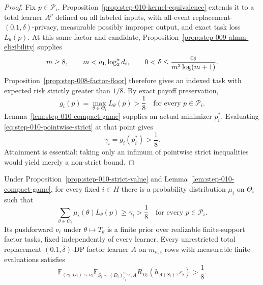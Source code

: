 \begin{proof}
Fix \(p\in\mathcal P_i\).  Proposition~\ref{prop:step-010-kernel-equivalence}
extends it to a total learner \(A^p\) defined on all labeled inputs, with
all-event replacement-\((0.1,\delta)\)-privacy, measurable possibly
improper output, and exact task loss \(L_\theta(p)\).  At this same factor
and candidate, Proposition~\ref{prop:step-009-almm-eligibility} supplies
\begin{equation}\label{eq:step-010-floor-eligibility}
m\ge8,
\qquad m<a_{\rm L}\log_2^*d_i,
\qquad
0<\delta\le\frac{c_\delta}{m^2\log(m+1)}.
\end{equation}
Proposition~\ref{prop:step-008-factor-floor} therefore gives an indexed
task with expected risk strictly greater than \(1/8\).  By exact payoff
preservation,
\begin{equation}\label{eq:step-010-pointwise-strict}
g_i(p)=\max_{\theta\in\Theta_i}L_\theta(p)>\frac18
\quad\text{for every }p\in\mathcal P_i.
\end{equation}
Lemma~\ref{lem:step-010-compact-game} supplies an actual minimizer
\(p_i^*\).  Evaluating \eqref{eq:step-010-pointwise-strict} at that point
gives
\[
\gamma_i=g_i(p_i^*)>\frac18.
\]
Attainment is essential: taking only an infimum of pointwise strict
inequalities would yield merely a non-strict bound.
\end{proof}

\begin{proposition}
\label{prop:step-010-hard-prior}
Under Proposition~\ref{prop:step-010-strict-value} and
Lemma~\ref{lem:step-010-compact-game}, for every fixed \(i\in H\) there is
a probability distribution \(\mu_i\) on \(\Theta_i\) such that
\begin{equation}\label{eq:step-010-indexed-prior}
\sum_{\theta\in\Theta_i}\mu_i(\theta)L_\theta(p)
\ge\gamma_i>\frac18
\quad\text{for every }p\in\mathcal P_i.
\end{equation}
Its pushforward \(\nu_i\) under \(\theta\mapsto T_\theta\) is a finite
prior over realizable finite-support factor tasks, fixed independently of
every learner.  Every unrestricted total replacement-\((0.1,\delta)\)-DP
factor learner \(A\) on \(m_{n,i}\) rows with measurable finite evaluations
satisfies
\begin{equation}\label{eq:step-010-hard-prior}
\mathbb E_{(c_i,D_i)\sim\nu_i}
\mathbb E_{S_i\sim(D_i)_{c_i}^{m_{n,i}},A}
R_{D_i}(h_{A(S_i)},c_i)>\frac18.
\end{equation}
\end{proposition}

